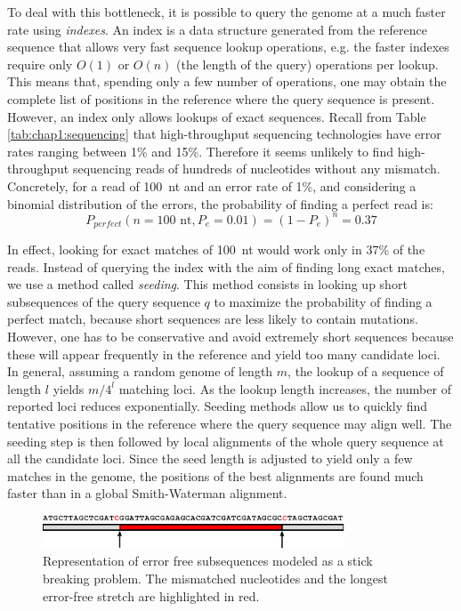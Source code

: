 To deal with this bottleneck, it is possible to query the genome at a
much faster rate using {\em indexes}. An index is a data structure
generated from the reference sequence that allows very fast sequence
lookup operations, e.g. the faster indexes require only $O(1)$ or
$O(n)$  (the length of the query) operations per lookup. This means
that, spending only a few number of operations, one may obtain the
complete list of positions in the reference where the query sequence is
present. However, an index only allows lookups of exact
sequences. Recall from Table \ref{tab:chap1:sequencing} that
high-throughput sequencing technologies have error rates ranging between
1\% and 15\%. Therefore it seems unlikely to find high-throughput
sequencing reads of hundreds of nucleotides without any
mismatch. Concretely, for a read of 100~nt and an error rate of 1\%,
and considering a binomial distribution of the errors, the probability
of finding a perfect read is:
\begin{equation}
  \label{eq:chap2:perfect_prob}
  P_{perfect}(n=100\mbox{ nt}, P_e=0.01) = (1-P_e)^n = 0.37
\end{equation}

In effect, looking for exact matches of 100~nt would work only in 37\%
of the reads. Instead of querying the index with the aim of finding
long exact matches, we use a method called {\em seeding}. This method
consists in looking up short subsequences of the query sequence $q$ to
maximize the probability of finding a perfect match, because short
sequences are less likely to contain mutations. However, one has to be
conservative and avoid extremely short sequences because these will
appear frequently in the reference and yield too many candidate
loci. In general, assuming a random genome of length $m$, the lookup
of a sequence of length $l$ yields $m/4^l$ matching loci. As the
lookup length increases, the number of reported loci reduces
exponentially. Seeding methods allow us to quickly find tentative
positions in the reference where the query sequence may align well. The
seeding step is then followed by local alignments of the whole query
sequence at all the candidate loci. Since the seed length is adjusted
to yield only a few matches in the genome, the positions of the best
alignments are found much faster than in a global Smith-Waterman
alignment.

\begin{figure}[h]
	\begin{minipage}[b]{\linewidth}
	  \centering
	  \includegraphics*[width=0.8\textwidth]{figures/chap2_stick_breaking}
	  \caption{Representation of error free subsequences modeled as a
       stick breaking problem. The mismatched nucleotides and the
       longest error-free stretch are highlighted in red.}
	  \label{fig:chap2:stick_breaking}
   \end{minipage}
\end{figure}

